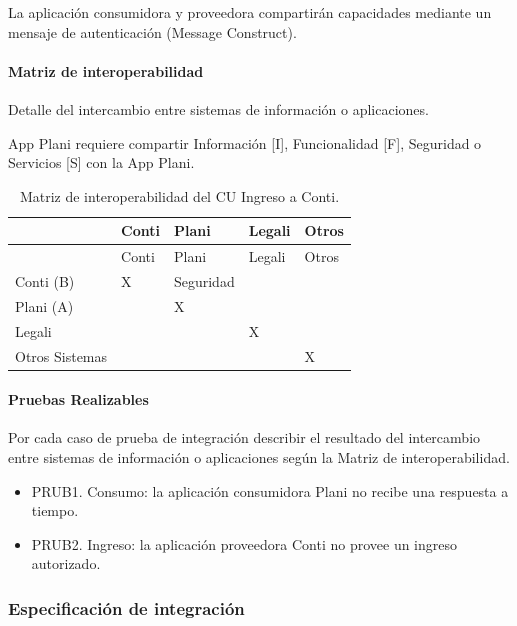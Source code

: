 \documentclass[
  paper=a4,
  ,captions=tableheading
]{scrartcl}
\providecommand{\tightlist}{%
  \setlength{\itemsep}{0pt}\setlength{\parskip}{0pt}}
\begin{document}
La aplicación consumidora y proveedora compartirán capacidades mediante
un mensaje de autenticación (Message Construct).

\paragraph{Matriz de
interoperabilidad}\label{sec:matriz-de-interoperabilidad}

Detalle del intercambio entre sistemas de información o aplicaciones.

App Plani requiere compartir Información {[}I{]}, Funcionalidad {[}F{]},
Seguridad o Servicios {[}S{]} con la App Plani.

\begin{longtable}[]{@{}lllll@{}}
\caption{Matriz de interoperabilidad del CU Ingreso a
Conti.}\tabularnewline
\toprule\noalign{}
& Conti & Plani & Legali & Otros \\
\midrule\noalign{}
\endfirsthead
\toprule\noalign{}
& Conti & Plani & Legali & Otros \\
\midrule\noalign{}
\endhead
\bottomrule\noalign{}
\endlastfoot
Conti (B) & X & Seguridad & & \\
Plani (A) & & X & & \\
Legali & & & X & \\
Otros Sistemas & & & & X \\
\end{longtable}

\paragraph{Pruebas Realizables}\label{sec:pruebas-realizables}

Por cada caso de prueba de integración describir el resultado del
intercambio entre sistemas de información o aplicaciones según la Matriz
de interoperabilidad.

\begin{itemize}
\tightlist
\item
  PRUB1. Consumo: la aplicación consumidora Plani no recibe una
  respuesta a tiempo.
\item
  PRUB2. Ingreso: la aplicación proveedora Conti no provee un ingreso
  autorizado.
\end{itemize}

\subsubsection{Especificación de
integración}\label{sec:especificaciuxf3n-de-integraciuxf3n-1}
\end{document}
